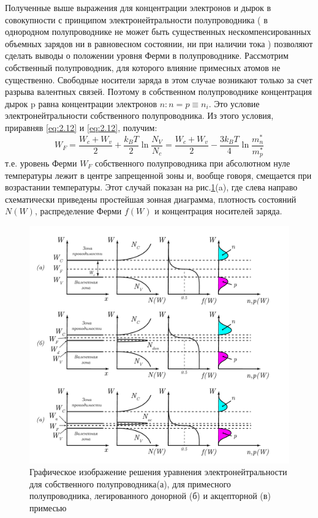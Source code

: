 Полученные выше выражения для концентрации электронов и дырок в совокупности с принципом электронейтральности
полупроводника ( в однородном полупроводнике не может быть существенных нескомпенсированных объемных зарядов ни в
равновесном состоянии, ни при наличии тока ) позволяют сделать выводы о положении уровня Ферми в полупроводнике.
Рассмотрим собственный полупроводник, для которого влияние примесных атомов не существенно. Свободные носители заряда в
этом случае возникают только за счет разрыва валентных связей. Поэтому в собственном полупроводнике концентрация дырок p
равна концентрации электронов $ n: n = p \equiv n_i$. Это условие электронейтральности собственного полупроводника. Из этого
условия, приравняв \eqref{eq:2.12} и \eqref{eq:2.12}, получим:
\begin{equation}
	W_{F}=\frac{W_{c}+W_{v}}{2}+\frac{k_{B} T}{2} \ln \frac{N_{V}}{N_{c}}=\frac{W_{c}+W_{v}}{2}-\frac{3 k_{B} T}{4} \ln \frac{m_{n}^{*}}{m_{p}^{*}}
	\label{eq:2.14}
\end{equation}
т.е. уровень Ферми $W_F$ собственного полупроводника при абсолютном нуле температуры лежит в центре запрещенной зоны и,
вообще говоря, смещается при возрастании температуры. Этот случай показан на рис.\ref{fig:2.1}(a), где слева направо схематически
приведены простейшая зонная диаграмма, плотность состояний $N(W)$, распределение Ферми $f (W)$ и концентрация носителей
заряда.


\begin{figure}[h!]
	\includegraphics[width = \linewidth]{img/22}
	\caption{Графическое изображение решения уравнения электронейтральности для собственного полупроводника(а), для примесного полупроводника, легированного донорной (б) и акцепторной (в) примесью}
	\label{fig:2.1}
\end{figure}

